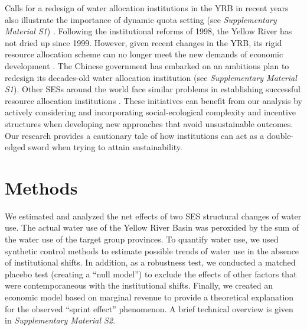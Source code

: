 \documentclass{article}
\begin{document}
Calls for a redesign of water allocation institutions in the YRB in recent years also illustrate the importance of dynamic quota setting (see \textit{Supplementary Material S1}) \cite{yuAdaptabilityassessmentpromotion2019}. Following the institutional reforms of 1998, the Yellow River has not dried up since 1999. However, given recent changes in the YRB, its rigid resource allocation scheme can no longer meet the new demands of economic development \cite{wangThingsCurrentSignificance2019}. The Chinese government has embarked on an ambitious plan to redesign its decades-old water allocation institution (see \textit{Supplementary Material S1}). Other SESs around the world face similar problems in establishing successful resource allocation institutions \cite{cummingQuantifyingSocialEcologicalScale2020, muneepeerakulStrategicbehaviorsgovernance2017, cummingAdvancingunderstandingnatural2020, leslieOperationalizingsocialecologicalsystems2015}. These initiatives can benefit from our analysis by actively considering and incorporating social-ecological complexity and incentive structures when developing new approaches that avoid unsustainable outcomes. Our research provides a cautionary tale of how institutions can act as a double-edged sword when trying to attain sustainability.


\section{Methods}
We estimated and analyzed the net effects of two SES structural changes of water use. The actual water use of the Yellow River Basin was peroxided by the sum of the water use of the target group provinces. To quantify water use, we used synthetic control methods to estimate possible trends of water use in the absence of institutional shifts. In addition, as a robustness test, we conducted a matched placebo test (creating a “null model”) to exclude the effects of other factors that were contemporaneous with the institutional shifts. Finally, we created an economic model based on marginal revenue to provide a theoretical explanation for the observed “sprint effect” phenomenon. A brief technical overview is given in \textit{Supplementary Material S2}.
\end{document}
